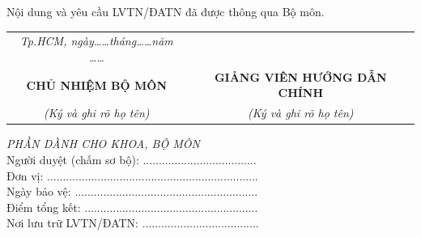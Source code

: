 Nội dung và yêu cầu LVTN/ĐATN đã được thông qua Bộ môn.

\begin{tabular}{p{} p{}}
    \multicolumn{1}{c}{\textit{Tp.HCM, ngày\dots\dots tháng\dots\dots năm \dots\dots}} &  \\
    \multicolumn{1}{c}{\textbf{CHỦ NHIỆM BỘ MÔN}} & \multicolumn{1}{c}{\textbf{GIẢNG VIÊN HƯỚNG DẪN CHÍNH}} \\
    \multicolumn{1}{c}{\textit{(Ký và ghi rõ họ tên)}} & \multicolumn{1}{c}{\textit{(Ký và ghi rõ họ tên)}} \\
\end{tabular}

\vspace{55pt}
\hphantom{..}\textit{PHẦN DÀNH CHO KHOA, BỘ MÔN}\\
\hphantom{..}Người duyệt (chấm sơ bộ): ....................................\\
\hphantom{..}Đơn vị: ...................................................................\\
\hphantom{..}Ngày bảo vệ: ..........................................................\\
\hphantom{..}Điểm tổng kết: .......................................................\\
\hphantom{..}Nơi lưu trữ LVTN/ĐATN: .....................................\\